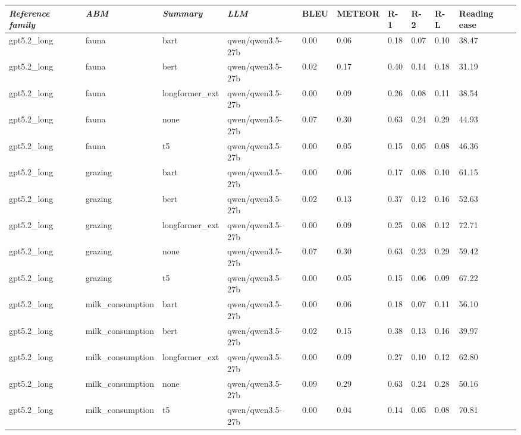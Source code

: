 \begin{tabular}{|l|l|l|l|l|l|l|l|l|l|}
\hline
\textit{\textbf{Reference family}} & \textit{\textbf{ABM}} & \textit{\textbf{Summary}} & \textit{\textbf{LLM}} & BLEU & METEOR & R-1 & R-2 & R-L & Reading ease \\
 \hline
 gpt5.2\_long & fauna & bart & qwen/qwen3.5-27b & 0.00 & 0.06 & 0.18 & 0.07 & 0.10 & 38.47 \\
 \hline
 gpt5.2\_long & fauna & bert & qwen/qwen3.5-27b & 0.02 & 0.17 & 0.40 & 0.14 & 0.18 & 31.19 \\
 \hline
 gpt5.2\_long & fauna & longformer\_ext & qwen/qwen3.5-27b & 0.00 & 0.09 & 0.26 & 0.08 & 0.11 & 38.54 \\
 \hline
 gpt5.2\_long & fauna & none & qwen/qwen3.5-27b & 0.07 & 0.30 & 0.63 & 0.24 & 0.29 & 44.93 \\
 \hline
 gpt5.2\_long & fauna & t5 & qwen/qwen3.5-27b & 0.00 & 0.05 & 0.15 & 0.05 & 0.08 & 46.36 \\
 \hline
 gpt5.2\_long & grazing & bart & qwen/qwen3.5-27b & 0.00 & 0.06 & 0.17 & 0.08 & 0.10 & 61.15 \\
 \hline
 gpt5.2\_long & grazing & bert & qwen/qwen3.5-27b & 0.02 & 0.13 & 0.37 & 0.12 & 0.16 & 52.63 \\
 \hline
 gpt5.2\_long & grazing & longformer\_ext & qwen/qwen3.5-27b & 0.00 & 0.09 & 0.25 & 0.08 & 0.12 & 72.71 \\
 \hline
 gpt5.2\_long & grazing & none & qwen/qwen3.5-27b & 0.07 & 0.30 & 0.63 & 0.23 & 0.29 & 59.42 \\
 \hline
 gpt5.2\_long & grazing & t5 & qwen/qwen3.5-27b & 0.00 & 0.05 & 0.15 & 0.06 & 0.09 & 67.22 \\
 \hline
 gpt5.2\_long & milk\_consumption & bart & qwen/qwen3.5-27b & 0.00 & 0.06 & 0.18 & 0.07 & 0.11 & 56.10 \\
 \hline
 gpt5.2\_long & milk\_consumption & bert & qwen/qwen3.5-27b & 0.02 & 0.15 & 0.38 & 0.13 & 0.16 & 39.97 \\
 \hline
 gpt5.2\_long & milk\_consumption & longformer\_ext & qwen/qwen3.5-27b & 0.00 & 0.09 & 0.27 & 0.10 & 0.12 & 62.80 \\
 \hline
 gpt5.2\_long & milk\_consumption & none & qwen/qwen3.5-27b & 0.09 & 0.29 & 0.63 & 0.24 & 0.28 & 50.16 \\
 \hline
 gpt5.2\_long & milk\_consumption & t5 & qwen/qwen3.5-27b & 0.00 & 0.04 & 0.14 & 0.05 & 0.08 & 70.81 \\
\hline
\end{tabular}
